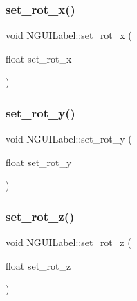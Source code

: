 \hypertarget{class_n_g_u_i_label_ad9261c783decf3beb777d15e4bf0f1c8}{}\label{class_n_g_u_i_label_ad9261c783decf3beb777d15e4bf0f1c8} 
\subsubsection{\texorpdfstring{set\+\_\+rot\+\_\+x()}{set\_rot\_x()}}
{\footnotesize\ttfamily void N\+G\+U\+I\+Label\+::set\+\_\+rot\+\_\+x (\begin{DoxyParamCaption}\item[{float}]{set\+\_\+rot\+\_\+x }\end{DoxyParamCaption})}

\hypertarget{class_n_g_u_i_label_a954ee244917ad318051ebf16752cb0a0}{}\label{class_n_g_u_i_label_a954ee244917ad318051ebf16752cb0a0} 
\subsubsection{\texorpdfstring{set\+\_\+rot\+\_\+y()}{set\_rot\_y()}}
{\footnotesize\ttfamily void N\+G\+U\+I\+Label\+::set\+\_\+rot\+\_\+y (\begin{DoxyParamCaption}\item[{float}]{set\+\_\+rot\+\_\+y }\end{DoxyParamCaption})}

\hypertarget{class_n_g_u_i_label_a4425a71dfc4e9ace165081c03dcddfd5}{}\label{class_n_g_u_i_label_a4425a71dfc4e9ace165081c03dcddfd5} 
\subsubsection{\texorpdfstring{set\+\_\+rot\+\_\+z()}{set\_rot\_z()}}
{\footnotesize\ttfamily void N\+G\+U\+I\+Label\+::set\+\_\+rot\+\_\+z (\begin{DoxyParamCaption}\item[{float}]{set\+\_\+rot\+\_\+z }\end{DoxyParamCaption})}

\hypertarget{class_n_g_u_i_label_a473eec25510bc4863b0729e4b69fee53}{}\label{class_n_g_u_i_label_a473eec25510bc4863b0729e4b69fee53} 
